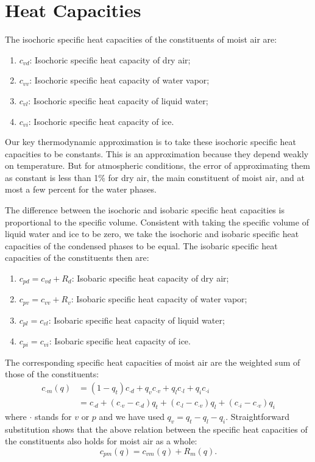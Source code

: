 \documentclass{report}
\begin{document}
\section{Heat Capacities}\label{s:heat_capacities}

The isochoric specific heat capacities of the constituents of moist air are:
\begin{enumerate}
    \item $c_{vd}$: Isochoric specific heat capacity of dry air;
    \item $c_{vv}$: Isochoric specific heat capacity of water vapor;
    \item $c_{vl}$: Isochoric specific heat capacity of liquid water;
    \item $c_{vi}$: Isochoric specific heat capacity of ice.
\end{enumerate}
Our key thermodynamic approximation is to take these isochoric specific heat capacities to be constants. This is an approximation because they depend weakly on temperature. But for atmospheric conditions, the error of approximating them as constant is less than 1\% for dry air, the main constituent of moist air, and at most a few percent for the water phases.

The difference between the isochoric and isobaric specific heat capacities is proportional to the specific volume. Consistent with taking the specific volume of liquid water and ice to be zero, we take the isochoric and isobaric specific heat capacities of the condensed phases to be equal. The isobaric specific heat capacities of the constituents then are:
\begin{enumerate}
    \item $c_{pd} = c_{vd} + R_d$: Isobaric specific heat capacity of dry air;
    \item $c_{pv} = c_{vv} + R_v$: Isobaric specific heat capacity of water vapor;
    \item $c_{pl} = c_{vl}$: Isobaric specific heat capacity of liquid water;
    \item $c_{pi} = c_{vi}$: Isobaric specific heat capacity of ice.
\end{enumerate}

The corresponding specific heat capacities of moist air are the weighted sum of those of the constituents:
\begin{align}
    c_{\cdot m}(q) & = (1-q_t) c_{\cdot d} + q_v c_{\cdot v} + q_l c_{\cdot l} + q_i c_{\cdot i} \label{e:specific_heat}\\
    & = c_{\cdot d} + (c_{\cdot v} - c_{\cdot d})q_t + (c_{\cdot l} - c_{\cdot v})q_l + (c_{\cdot i} - c_{\cdot v})q_i
\end{align}
where $\cdot$ stands for $v$ or $p$ and we have used $q_v = q_t -q_l - q_i$. Straightforward substitution shows that the above relation between the specific heat capacities of the constituents also holds for moist air as a whole:
\begin{equation}\label{e:specific_heat_relation}
    c_{pm}(q) = c_{vm}(q) + R_m(q).
\end{equation}
\end{document}
